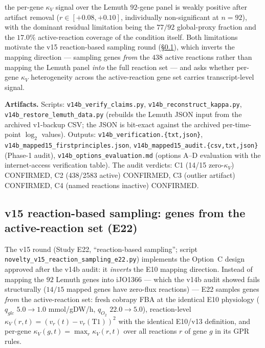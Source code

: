 \documentclass[11pt,a4paper]{article}
\theoremstyle{plain}
\theoremstyle{definition}
\theoremstyle{remark}
\begin{document}
the per-gene $\kappa_V$ signal over the Lemuth $92$-gene panel is
weakly positive after artifact removal ($r \in [+0.08, +0.10]$,
individually non-significant at $n=92$), with the dominant residual
limitation being the $77/92$ global-proxy fraction and the $17.0\%$
active-reaction coverage of the condition itself. Both limitations
motivate the v15 reaction-based sampling round
(\S\ref{sec:novelty-v15}), which inverts the mapping direction ---
sampling genes \emph{from} the $438$ active reactions rather than
mapping the Lemuth panel \emph{into} the full reaction set --- and
asks whether per-gene $\kappa_V$ heterogeneity across the
active-reaction gene set carries transcript-level signal.

\textbf{Artifacts.} Scripts: \texttt{v14b\_verify\_claims.py},
\texttt{v14b\_reconstruct\_kappa.py},
\texttt{v14b\_restore\_lemuth\_data.py} (rebuilds the Lemuth JSON
input from the archived v1-backup CSV; the JSON is bit-exact against
the archived per-time-point $\log_2$ values). Outputs:
\texttt{v14b\_verification.\{txt,json\}},
\texttt{v14b\_mapped15\_firstprinciples.json},
\texttt{v14b\_mapped15\_audit.\{csv,txt,json\}} (Phase-1 audit),
\texttt{v14b\_options\_evaluation.md} (options A--D evaluation with
the internet-access verification table). The audit verdicts: C1
(14/15 zero-$\kappa_V$) CONFIRMED, C2 (438/2583 active) CONFIRMED,
C3 (outlier artifact) CONFIRMED, C4 (named reactions inactive)
CONFIRMED.

\subsection{v15 reaction-based sampling: genes from the active-reaction
set (E22)}\label{sec:novelty-v15}

The v15 round (Study E22, ``reaction-based sampling''; script
\texttt{novelty\_v15\_reaction\_sampling\_e22.py}) implements the Option~C
design approved after the v14b audit: it \emph{inverts} the E10 mapping
direction. Instead of mapping the $92$ Lemuth genes into iJO1366 ---
which the v14b audit showed fails structurally ($14/15$ mapped genes
have zero-flux reactions) --- E22 samples genes \emph{from} the
active-reaction set: fresh cobrapy FBA at the identical E10 physiology
($q_{glc}$ $5.0 \to 1.0$ mmol/gDW/h, $q_{O_2}$ $22.0 \to 5.0$),
reaction-level $\kappa_V(r,t) = (v_r(t) - v_r(\mathrm{T1}))^2$ with the
identical E10/v13 definition, and per-gene
$\kappa_V(g,t) = \max_r \kappa_V(r,t)$ over all reactions $r$ of gene
$g$ in its GPR rules.
\end{document}
